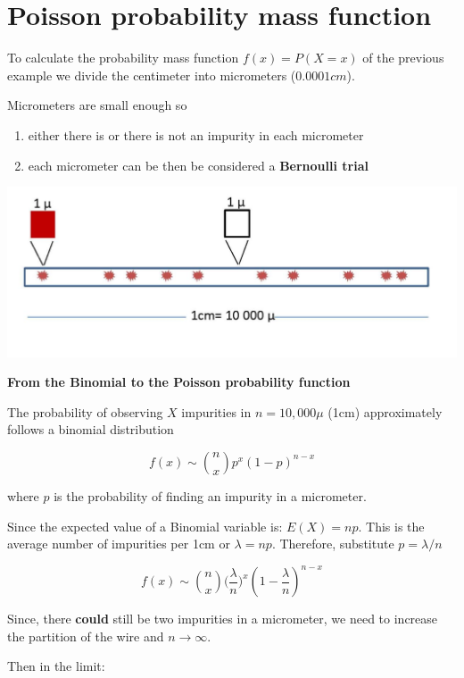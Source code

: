 \documentclass[
]{book}
\begin{document}
\hypertarget{poisson-probability-mass-function}{%
\section{Poisson probability mass function}\label{poisson-probability-mass-function}}

To calculate the probability mass function \(f(x)=P(X=x)\) of the previous example we divide the centimeter into micrometers (\(0.0001cm\)).

Micrometers are small enough so

\begin{enumerate}
\def\labelenumi{\arabic{enumi})}
\item
  either there is or there is not an impurity in each micrometer
\item
  each micrometer can be then be considered a \textbf{Bernoulli trial}
\end{enumerate}

\includegraphics{./figures/Pois.JPG}

\textbf{From the Binomial to the Poisson probability function}

The probability of observing \(X\) impurities in \(n=10,000\mu\) (1cm) approximately follows a binomial distribution

\[f(x) \sim \binom n x p^x(1-p)^{n-x}\]

where \(p\) is the probability of finding an impurity in a micrometer.

Since the expected value of a Binomial variable is:
\(E(X)=np\). This is the average number of impurities per 1cm or \(\lambda=np\). Therefore, substitute \(p=\lambda/n\)

\[f(x) \sim \binom n x \big(\frac{\lambda}{n}\big)^x(1-\frac{\lambda}{n})^{n-x}\]

Since, there \textbf{could} still be two impurities in a micrometer, we need to increase the partition of the wire and \(n \rightarrow \infty\).

Then in the limit:
\end{document}
